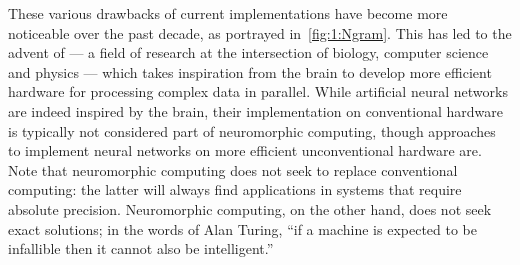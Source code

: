 These various drawbacks of current implementations have become more noticeable over the past decade, as portrayed in~\cref{fig:1:Ngram}.
This has led to the advent of  --- a field of research at the intersection of biology, computer science and physics --- which takes inspiration from the brain to develop more efficient hardware for processing complex data in parallel.
While artificial neural networks are indeed inspired by the brain, their implementation on conventional hardware is typically not considered part of neuromorphic computing, though approaches to implement neural networks on more efficient unconventional hardware are. %
Note that neuromorphic computing does not seek to replace conventional computing: the latter will always find applications in systems that require absolute precision. %
Neuromorphic computing, on the other hand, does not seek exact solutions; in the words of Alan Turing, ``if a machine is expected to be infallible then it cannot also be intelligent.''


